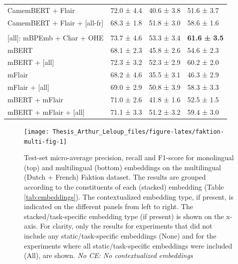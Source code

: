 \documentclass[12pt,a4paper,]{book}
\begin{document}
\begin{table}
\begin{tabular}[t]{llll}
\hspace{1em}CamemBERT + Flair & 72.0 ± 4.4 & 40.6 ± 3.8 & 51.6 ± 3.7\\
\hspace{1em}CamemBERT + Flair + [all-fr] & 68.3 ± 1.8 & 51.8 ± 3.0 & 58.6 ± 1.6\\
\addlinespace[0.3em]
\multicolumn{4}{l}{\textbf{Multilingual embeddings}}\\
\hspace{1em}[all]: mBPEmb + Char + OHE & 73.7 ± 4.6 & 53.3 ± 3.4 & \textbf{61.6 ± 3.5}\\
\hspace{1em}mBERT & 68.1 ± 2.3 & 45.8 ± 2.6 & 54.6 ± 2.3\\
\hspace{1em}mBERT + [all] & 72.3 ± 3.2 & 52.3 ± 2.9 & 60.2 ± 2.0\\
\hspace{1em}mFlair & 68.2 ± 4.6 & 35.5 ± 3.1 & 46.3 ± 2.9\\
\hspace{1em}mFlair + [all] & 69.0 ± 2.9 & 50.8 ± 3.9 & 58.3 ± 3.3\\
\hspace{1em}mBERT + mFlair & 71.0 ± 2.6 & 41.8 ± 1.6 & 52.5 ± 1.5\\
\hspace{1em}mBERT + mFlair + [all] & 71.1 ± 3.3 & 51.2 ± 3.2 & 59.4 ± 3.0\\
\bottomrule
\end{tabular}
\end{table}



\begin{figure}

{\centering \texttt{[image: Thesis\_Arthur\_Leloup\_files/figure-latex/faktion-multi-fig-1]} 

}

\caption{Test-set micro-average precision, recall and F1-score for monolingual (top) and multilingual (bottom) embeddings on the multilingual (Dutch + French) Faktion dataset. The results are grouped according to the constituents of each (stacked) embedding (Table \ref{tab:embeddings}). The contextualized embedding type, if present, is indicated on the different panels from left to right. The stacked/task-specific embedding type (if present) is shown on the x-axis. For clarity, only the results for experiments that did not include any static/task-specific embeddings (None) and for the experiments where all static/task-specific embeddings were included (All), are shown. \emph{No CE: No contextualized embeddings}}\label{fig:faktion-multi-fig}
\end{figure}
\end{document}
